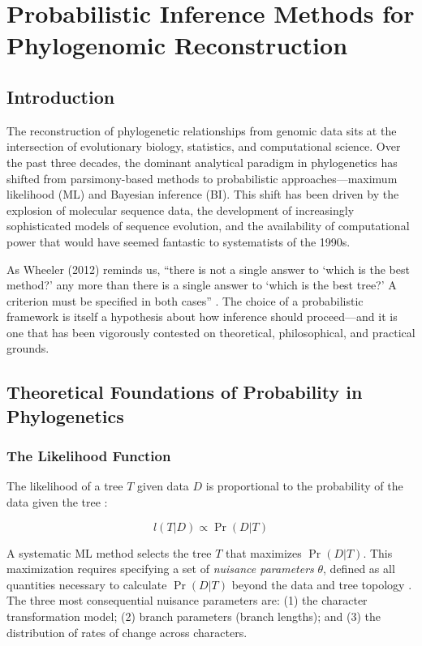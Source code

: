 \chapter{Probabilistic Inference Methods for Phylogenomic Reconstruction}

\section{Introduction}

The reconstruction of phylogenetic relationships from genomic data sits at the intersection of evolutionary biology, statistics, and computational science. Over the past three decades, the dominant analytical paradigm in phylogenetics has shifted from parsimony-based methods to probabilistic approaches---maximum likelihood (ML) and Bayesian inference (BI). This shift has been driven by the explosion of molecular sequence data, the development of increasingly sophisticated models of sequence evolution, and the availability of computational power that would have seemed fantastic to systematists of the 1990s.

As Wheeler (2012) reminds us, ``there is not a single answer to `which is the best method?' any more than there is a single answer to `which is the best tree?' A criterion must be specified in both cases'' \parencite{wheeler2012}. The choice of a probabilistic framework is itself a hypothesis about how inference should proceed---and it is one that has been vigorously contested on theoretical, philosophical, and practical grounds.

\section{Theoretical Foundations of Probability in Phylogenetics}

\subsection{The Likelihood Function}

The likelihood of a tree $T$ given data $D$ is proportional to the probability of the data given the tree \parencite{edwards1972}:

$$l(T|D) \propto \Pr(D|T)$$

A systematic ML method selects the tree $T$ that maximizes $\Pr(D|T)$. This maximization requires specifying a set of \textit{nuisance parameters} $\theta$, defined as all quantities necessary to calculate $\Pr(D|T)$ beyond the data and tree topology \parencite{wheeler2012}. The three most consequential nuisance parameters are: (1) the character transformation model; (2) branch parameters (branch lengths); and (3) the distribution of rates of change across characters.

